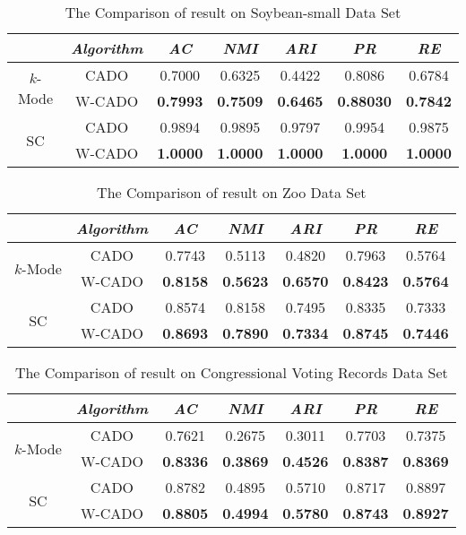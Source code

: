 \documentclass[review]{elsarticle}
\begin{document}
\begin{table}[!h]\tabcolsep=0.065in
\centering
\caption{The Comparison of result on Soybean-small Data Set}
\small
\label{tab:The Clustering Results Comparison on Soybean-small Data Set}
\begin{tabular}{ccccccc}
\hline
\emph{}&\emph{Algorithm}&\emph{AC}&\emph{NMI}&\emph{ARI}&\emph{PR}&\emph{RE} \\
\hline
\multirow{2}{*}{$k$-Mode} & CADO & 0.7000  & 0.6325  & 0.4422  & 0.8086  & 0.6784 \\
    & W-CADO & \textbf{0.7993} & \textbf{0.7509} & \textbf{0.6465} & \textbf{0.88030} & \textbf{0.7842}\\
    \hline
\multirow{2}{*}{SC} & CADO & 0.9894 & 0.9895 & 0.9797 & 0.9954 & 0.9875\\
    & W-CADO & \textbf{1.0000} & \textbf{1.0000} & \textbf{1.0000} & \textbf{1.0000} & \textbf{1.0000}\\
\hline
\end{tabular}
\end{table}

\begin{table}[!h]\tabcolsep=0.065in
\centering
\caption{The Comparison of result on Zoo Data Set}
\small
\label{tab:The Clustering Results Comparison on Zoo Data Set}
\begin{tabular}{ccccccc}
\hline
\emph{}&\emph{Algorithm}&\emph{AC}&\emph{NMI}&\emph{ARI}&\emph{PR}&\emph{RE} \\
\hline
\multirow{2}{*}{$k$-Mode} & CADO & 0.7743 & 0.5113 & 0.4820 & 0.7963 & 0.5764\\
    & W-CADO & \textbf{0.8158} & \textbf{0.5623} & \textbf{0.6570} & \textbf{0.8423} & \textbf{0.5764}\\
    \hline
\multirow{2}{*}{SC} & CADO & 0.8574 & 0.8158 & 0.7495 & 0.8335 & 0.7333\\
    & W-CADO & \textbf{0.8693} & \textbf{0.7890} & \textbf{0.7334} & \textbf{0.8745} & \textbf{0.7446}\\
\hline
\end{tabular}
\end{table}

\begin{table}[!h]\tabcolsep=0.065in
\centering
\caption{The Comparison of result on Congressional Voting Records Data Set}
\small
\label{tab:The Clustering Results Comparison on Congressional Voting Records Data Set}
\begin{tabular}{ccccccc}
\hline
\emph{}&\emph{Algorithm}&\emph{AC}&\emph{NMI}&\emph{ARI}&\emph{PR}&\emph{RE} \\
\hline
\multirow{2}{*}{$k$-Mode} & CADO & 0.7621 & 0.2675 & 0.3011 & 0.7703 & 0.7375\\
    & W-CADO & \textbf{0.8336} & \textbf{0.3869} & \textbf{0.4526} & \textbf{0.8387} & \textbf{0.8369}\\
    \hline
\multirow{2}{*}{SC} & CADO & 0.8782 & 0.4895 & 0.5710 & 0.8717 & 0.8897\\
    & W-CADO & \textbf{0.8805} & \textbf{0.4994} & \textbf{0.5780} & \textbf{0.8743} & \textbf{0.8927}\\
\hline
\end{tabular}
\end{table}
\end{document}
